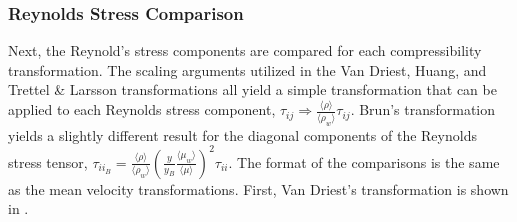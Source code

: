 \subsubsection{Reynolds Stress Comparison}
Next, the Reynold's stress components are compared for each compressibility transformation. The scaling arguments utilized in the Van Driest, Huang, and Trettel \& Larsson transformations all yield a simple transformation that can be applied to each Reynolds stress component, $\tau_{ij} \Rightarrow \frac{\langle \rho \rangle}{\langle \rho_w \rangle}\tau_{ij}$. Brun's transformation yields a slightly different result for the diagonal components of the Reynolds stress tensor, $\tau_{{ii}_B} = \frac{\langle \rho \rangle}{\langle \rho_w \rangle}(\frac{y}{y_B}\frac{\langle \mu_w \rangle}{\langle \mu \rangle})^2 \tau_{ii}$. The format of the comparisons is the same as the mean velocity transformations. First, Van Driest's transformation is shown in .

